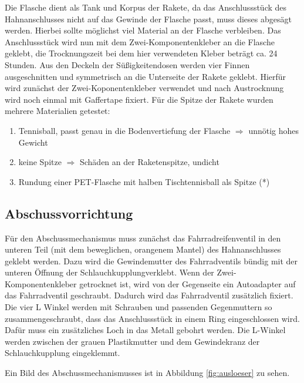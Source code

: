 Die Flasche dient als Tank und Korpus der Rakete, da das Anschlussstück des Hahnanschlusses nicht auf das Gewinde der Flasche passt, muss dieses abgesägt werden. Hierbei sollte möglichst viel Material an der Flasche verbleiben.
Das Anschlussstück wird nun mit dem Zwei-Komponentenkleber an die Flasche geklebt, die Trocknungszeit bei dem hier verwendeten Kleber beträgt ca. 24 Stunden. 
Aus den Deckeln der Süßigkeitendosen werden vier Finnen ausgeschnitten und symmetrisch an die Unterseite der Rakete geklebt. Hierfür wird zunächst der Zwei-Koponentenkleber verwendet und nach Austrocknung wird noch einmal mit Gaffertape fixiert.
Für die Spitze der Rakete wurden mehrere Materialien getestet:
\begin{enumerate}
\item Tennisball, passt genau in die Bodenvertiefung der Flasche $\Rightarrow$ unnötig hohes Gewicht
\item keine Spitze $\Rightarrow$ Schäden an der Raketenspitze, undicht
\item Rundung einer PET-Flasche mit halben Tischtennisball als Spitze (*)
\end{enumerate}


\subsection{Abschussvorrichtung}

Für den Abschussmechanismus muss zunächst das Fahrradreifenventil in den unteren Teil (mit dem beweglichen, orangenem Mantel) des Hahnanschlusses geklebt werden. Dazu wird die Gewindemutter des Fahrradventils bündig mit der unteren Öffnung der Schlauchkupplungverklebt. Wenn der Zwei-Komponentenkleber getrocknet ist, wird von der Gegenseite ein Autoadapter auf das Fahrradventil geschraubt. Dadurch wird das Fahrradventil zusätzlich fixiert.
 Die vier L Winkel werden mit Schrauben und passenden Gegenmuttern so zusammengeschraubt, dass das Anschlussstück in einem Ring eingeschlossen wird. Dafür muss ein zusätzliches Loch in das Metall gebohrt werden. Die L-Winkel werden zwischen der grauen Plastikmutter und dem Gewindekranz der Schlauchkupplung eingeklemmt.


Ein Bild des Abschussmechanismusses ist in Abbildung \ref{fig:ausloeser} zu sehen.





